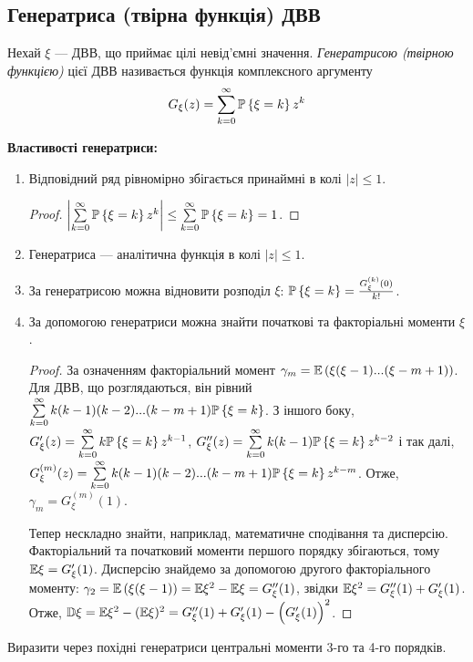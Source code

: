 \subsection{Генератриса (твірна функція) ДВВ}
\begin{definition}
    Нехай $\xi$ --- ДВВ, що приймає цілі невід'ємні значення. 
    \emph{Генератрисою (твірною функцією)} цієї ДВВ називається функція комплексного аргументу
    \begin{equation}\label{eq:gen_func}
        G_\xi(z) = \sum\limits_{k=0}^{\infty} \P\left\{\xi = k\right\} z^k
    \end{equation}
\end{definition}
\noindent \textbf{Властивості генератриси:}
\begin{enumerate}
    \item Відповідний ряд рівномірно збігається принаймні в колі $|z|\leq 1$.
    \begin{proof}
        $\left| \sum\limits_{k=0}^{\infty} \P\left\{\xi = k\right\} z^k \right| \leq \sum\limits_{k=0}^{\infty} \P\left\{\xi = k\right\} = 1$.
    \end{proof}
    \item Генератриса --- аналітична функція в колі $|z|\leq 1$.
    \item За генератрисою можна відновити розподіл $\xi$:
    $\P\left\{\xi = k\right\} = \frac{G_\xi^{(k)}(0)}{k!}$.
    \item За допомогою генератриси можна знайти початкові та факторіальні моменти $\xi$.
    \begin{proof}
        За означенням факторіальний момент $\gamma_m = \E\left( \xi (\xi - 1) ... (\xi - m + 1)\right)$.
        Для ДВВ, що розглядаються, він рівний $\sum\limits_{k=0}^{\infty} k(k-1)(k-2)...(k-m+1) \P\left\{\xi = k\right\}$.
        З іншого боку, $G'_\xi(z) = \sum\limits_{k=0}^{\infty} k \P\left\{\xi = k\right\} z^{k-1}$,
        $G''_\xi(z) = \sum\limits_{k=0}^{\infty} k(k-1) \P\left\{\xi = k\right\} z^{k-2}$ і так далі,
        $G^{(m)}_\xi(z) = \sum\limits_{k=0}^{\infty} k(k-1)(k-2)...(k-m+1) \P\left\{\xi = k\right\} z^{k-m}$.
        Отже, $\gamma_m = G^{(m)}_\xi(1)$.
        
        Тепер нескладно знайти, наприклад, математичне сподівання та дисперсію.
        Факторіальний та початковий моменти першого порядку збігаються, тому $\E\xi = G'_\xi(1)$.
        Дисперсію знайдемо за допомогою другого факторіального моменту: $\gamma_2 = \E\left( \xi (\xi - 1)\right) = \E\xi^2 - \E\xi = G''_\xi(1)$,
        звідки $\E\xi^2 = G''_\xi(1) + G'_\xi(1)$. 
        Отже, $\D\xi = \E\xi^2 - (\E\xi)^2 = G''_\xi(1) + G'_\xi(1) - \left( G'_\xi(1)\right)^2$.
    \end{proof}
\end{enumerate}
\begin{exercise}
    Виразити через похідні генератриси центральні моменти 3-го та 4-го порядків.
\end{exercise}
